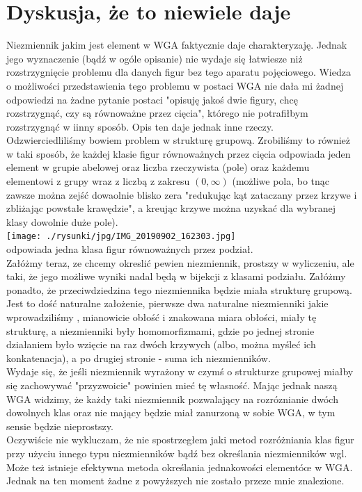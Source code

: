\documentclass[a4paper, 12pt]{article}
\newcommand{\rysunek}[1]{\hfill \break\\[16pt] \Huge \textbf{\textcolor{violet}{Brakujący rysunek \normalsize
#1}} \hfill
\break \\[16pt] \normalsize}
\begin{document}
\section{Dyskusja, że to niewiele daje}
Niezmiennik jakim jest element w WGA faktycznie daje charakteryzaję. Jednak jego wyznaczenie (bądź w ogóle
opisanie) nie wydaje się łatwiesze niż rozstrzygnięcie problemu dla danych figur bez tego aparatu
pojęciowego. Wiedza o możliwości przedstawienia tego problemu w postaci WGA nie dała mi żadnej odpowiedzi
na żadne pytanie postaci "opisuję jakoś dwie figury, chcę rozstrzygnąć, czy są równoważne przez cięcia",
którego nie potrafiłbym rozstrzygnąć w iinny sposób. Opis ten daje jednak inne rzeczy.\\
Odzwierciedliliśmy bowiem problem w strukturę grupową. Zrobiliśmy to również w taki sposób, że każdej klasie
figur równoważnych przez cięcia odpowiada jeden element w grupie abelowej oraz liczba rzeczywista (pole)
oraz każdemu elementowi z grupy wraz z liczbą z zakresu $(0, \infty)$ (możliwe pola, bo tnąc zawsze można
zejść dowaolnie blisko zera "redukując kąt zataczany przez krzywe i zbliżając powstałe krawędzie", a
kreując krzywe można uzyskać dla wybranej klasy dowolnie duże pole). \\
\texttt{[image: ./rysunki/jpg/IMG\_20190902\_162303.jpg]} \\
odpowiada jedna klasa figur równoważnych przez podział. \\
Załóżmy teraz, ze chcemy okreslić pewien niezmiennik, prostszy w wyliczeniu, ale taki, że jego możliwe wyniki
nadal będą w bijekcji z klasami podziału. Załóżmy ponadto, że przeciwdziedzina tego niezmiennika będzie miała
strukturę grupową. Jest to dość naturalne założenie, pierwsze dwa naturalne niezmienniki jakie wprowadziliśmy
, mianowicie obłość i znakowana miara obłości, miały tę strukturę, a niezmienniki były homomorfizmami,
gdzie po jednej stronie działaniem było wzięcie na raz dwóch krzywych (albo, można myśleć ich konkatenacja),
a po drugiej stronie - suma ich niezmienników. \\
Wydaje się, że jeśli niezmiennik wyrażony w czymś o strukturze grupowej miałby się zachowywać "przyzwoicie"
powinien mieć tę własność. Mając jednak naszą WGA widzimy, że każdy taki niezmiennik pozwalający na
rozróznianie dwóch dowolnych klas oraz nie mający będzie miał zanurzoną w sobie WGA, w tym sensie będzie
nieprostszy. \\
Oczywiście nie wykluczam, że nie spostrzegłem jaki metod rozróżniania klas figur przy użyciu innego typu
niezmienników bądź bez określania niezmienników wgl. Może też istnieje efektywna metoda określania
jednakowości elementóœ w WGA. Jednak na ten moment żadne z powyższych nie zostało przeze mnie znalezione.
\end{document}
